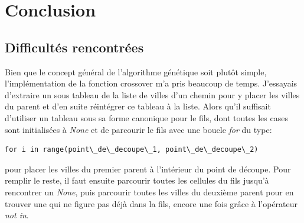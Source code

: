 \documentclass[11pt]{article}
\begin{document}
\section{Conclusion}

\subsection{Difficultés rencontrées}
Bien que le concept général de l'algorithme génétique soit plutôt simple, l'implémentation de la fonction crossover m'a pris beaucoup
de temps. J'essayais d'extraire un sous tableau de la liste de villes d'un chemin pour y placer les villes du parent et d'en suite réintégrer
ce tableau à la liste. Alors qu'il suffisait d'utiliser un tableau sous sa forme canonique pour le fils, dont toutes les cases sont initialisées à
\emph{None} et de parcourir le fils avec une boucle \emph{for} du type:
\begin{verbatim}
for i in range(point\_de\_decoupe\_1, point\_de\_decoupe\_2)
\end{verbatim}
pour placer les villes du premier parent à l'intérieur du point de découpe. Pour remplir le reste, il faut ensuite parcourir toutes les cellules du fils
jusqu'à rencontrer un \emph{None}, puis parcourir toutes les villes du deuxième parent pour en trouver une qui ne figure pas déjà dans la fils, encore
une fois grâce à l'opérateur \emph{not in}.
\end{document}
